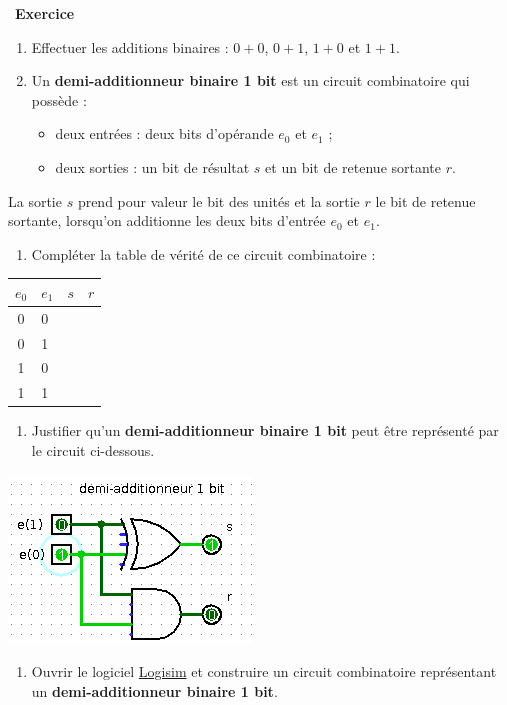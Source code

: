 \documentclass[
  11pt,
]{article}
\providecommand{\tightlist}{%
  \setlength{\itemsep}{0pt}\setlength{\parskip}{0pt}}
\newcounter{exo}
\newenvironment{exercice}[1]
{\par \medskip   \addtocounter{exo}{1} \noindent  
\begin{bclogo}[arrondi =0.1,   noborder = true, logo=\bccrayon, marge=4]{~\textbf{Exercice} \textbf{\theexo} {\itshape #1} }  \par}
{
\end{bclogo}
 \par \bigskip }
\newcounter{def}
\newcounter{logi}
\begin{document}
\begin{exercice}{}

\begin{enumerate}
\def\labelenumi{\arabic{enumi}.}
\item
  Effectuer les additions binaires : \(0+0\), \(0+1\), \(1+0\) et
  \(1+1\).
\item
  Un \textbf{demi-additionneur binaire 1 bit} est un circuit
  combinatoire qui possède :

  \begin{itemize}
  \tightlist
  \item
    deux entrées : deux bits d'opérande \(e_{0}\) et \(e_{1}\) ;
  \item
    deux sorties : un bit de résultat \(s\) et un bit de retenue
    sortante \(r\).
  \end{itemize}
\end{enumerate}

La sortie \(s\) prend pour valeur le bit des unités et la sortie \(r\)
le bit de retenue sortante, lorsqu'on additionne les deux bits d'entrée
\(e_{0}\) et \(e_{1}\).

\begin{enumerate}
\def\labelenumi{\arabic{enumi}.}
\tightlist
\item
  Compléter la table de vérité de ce circuit combinatoire :
\end{enumerate}

\begin{longtable}[]{@{}clll@{}}
\toprule
\(e_{0}\) & \(e_{1}\) & \(s\) & \(r\)\tabularnewline
\midrule
\endhead
0 & 0 & &\tabularnewline
0 & 1 & &\tabularnewline
1 & 0 & &\tabularnewline
1 & 1 & &\tabularnewline
\bottomrule
\end{longtable}

\begin{enumerate}
\def\labelenumi{\arabic{enumi}.}
\setcounter{enumi}{3}
\tightlist
\item
  Justifier qu'un \textbf{demi-additionneur binaire 1 bit} peut être
  représenté par le circuit ci-dessous.
\end{enumerate}

\includegraphics{images/demi_additionneur.png}\\

\begin{enumerate}
\def\labelenumi{\arabic{enumi}.}
\setcounter{enumi}{4}
\tightlist
\item
  Ouvrir le logiciel \href{http://www.cburch.com/logisim/}{Logisim} et
  construire un circuit combinatoire représentant un
  \textbf{demi-additionneur binaire 1 bit}.
\end{enumerate}

\end{exercice}
\end{document}
